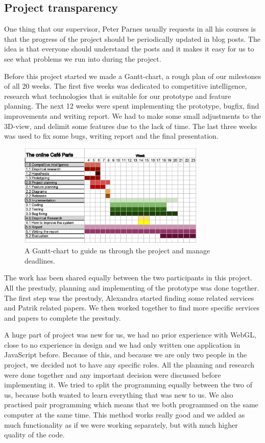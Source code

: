 \documentclass[12pt, titlepage]{article}
\begin{document}
\subsection{Project transparency}
One thing that our supervisor, Peter Parnes usually requests in all his courses is that the progress of the project should be periodically updated in blog posts\cite{1}. The idea is that everyone should understand the posts and it makes it easy for us to see what problems we run into during the project.

Before this project started we made a Gantt-chart, a rough plan of our milestones of all 20 weeks. The first five weeks was dedicated to competitive intelligence, research what technologies that is suitable for our prototype and feature planning. The next 12 weeks were spent implementing the prototype, bugfix, find improvements and writing report. We had to make some small adjustments to the 3D-view, and delimit some features due to the lack of time. The last three weeks was used to fix some bugs, writing report and the final presentation.
\begin{figure}[H]
  \centering
	\includegraphics[width=0.8\textwidth,keepaspectratio]{grovplanering.jpg}
  \caption{A Gantt-chart to guide us through the project and manage deadlines.}
\end{figure}
The work has been shared equally between the two participants in this project. All the prestudy, planning and implementing of the prototype was done together. The first step was the prestudy, Alexandra started finding some related services and Patrik related papers. We then worked together to find more specific services and papers to complete the prestudy.

A huge part of project was new for us, we had no prior experience with WebGL, close to no experience in design and we had only written one application in JavaScript before. Because of this, and because we are only two people in the project, we decided not to have any specific roles. All the planning and research were done together and any important decision were discussed before implementing it. We tried to split the programming equally between the two of us, because both wanted to learn everything that was new to us. We also practised pair programming which means that we both programmed on the same computer at the same time. This method works really good and we added as much functionality as if we were working separately, but with much higher quality of the code.
\end{document}
